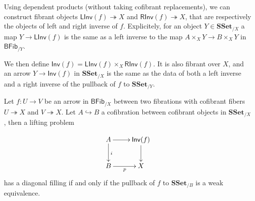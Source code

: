 \documentclass[reqno,10pt,a4paper,oneside]{amsart}
\numberwithin{equation}{section}
\theoremstyle{mythm}
\theoremstyle{mydef}
\theoremstyle{myrmk}
\newcommand{\SSet}{\mathbf{SSet}}
\newcommand{\Iseq}{\mathsf{Inv}}
\newcommand{\Linv}{\mathsf{LInv}}
\newcommand{\Rinv}{\mathsf{RInv}}
\newcommand{\BFFib}{\mathsf{BFib}}
\begin{document}
Using dependent products (without taking cofibrant replacements), we can construct fibrant objects $\Linv(f) \twoheadrightarrow X$ and $\Rinv(f) \twoheadrightarrow X$, that are respectively the objects of left and right inverse of $f$. Explicitely, for an object $Y \in \SSet_{/X}$ a map $Y \to \Linv(f)$ is the same as a left inverse to the map $A \times_{X} Y \to B \times_X Y$ in $\BFFib_{/Y}$.

We then define $\Iseq(f) = \Linv(f) \times_X \Rinv(f)$. It is also fibrant over $X$, and an arrow $Y \to \Iseq(f)$ in $\SSet_{/X}$ is the same as the data of both a left inverse and a right inverse of the pullback of $f$ to $\SSet_{/Y}$.


\begin{proposition} \label{thm:black-box}
Let $f:U \to V$ be an arrow in $\BFFib_{/X}$ between two fibrations with cofibrant fibers $U \twoheadrightarrow X$ and $V \twoheadrightarrow X$. Let $A \hookrightarrow B$ a cofibration between cofibrant objects in $\SSet_{/X}$, then a lifting problem

\[
\xymatrix{ A \ar[r] \ar[d]^i & \Iseq(f) \ar[d] \\
B \ar[r]_{p} & X
}
\]
has a diagonal filling if and only if the pullback of $f$ to $\SSet_{/B}$ is a weak equivalence.
\end{proposition}
\end{document}
